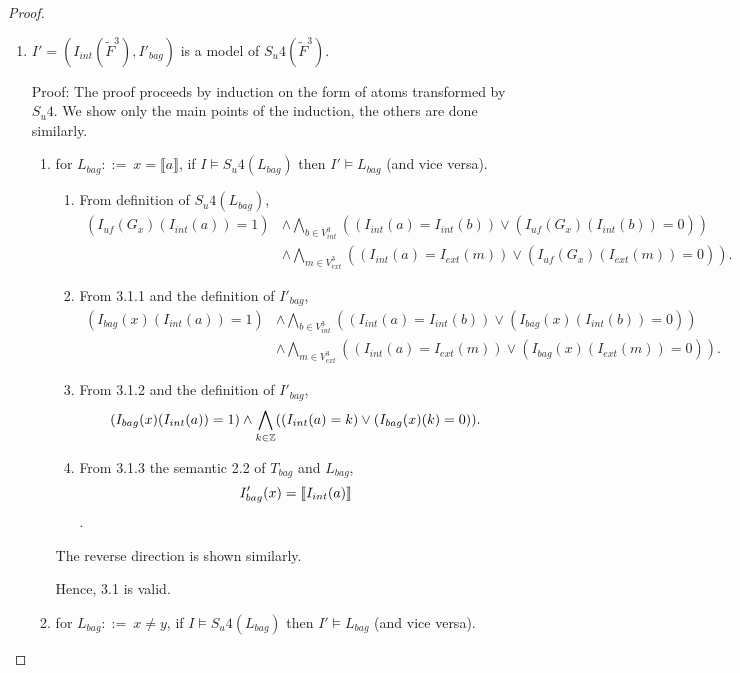 \begin{proof}
\begin{enumerate}[1.]
\item %
$I'=(I_{int}(\tilde{F}^3),I'_{bag})$ is a model of $S_{u}4(\tilde{F}^3)$.

Proof: The proof proceeds by induction on the form of atoms transformed by $S_{u}4$. We show only the main points of the induction, the others are done similarly.

\begin{enumerate}[3.1]
\item %
for $L_{bag} ::=\ x = \llbracket a \rrbracket$, if $I \models S_{u}4(L_{bag})$ then $I'\models L_{bag}$ (and vice versa). \\

\begin{enumerate}[3.1.1]
\item %
From definition of $S_{u}4(L_{bag})$,
\begin{align*}
(I_{\textit{uf}}(G_{x})(I_{int}(a)) = 1)  
&\land \underset{b\in V^3_{int}}{\bigwedge}((I_{int}(a) = I_{int}(b)) \lor (I_{\textit{uf}}(G_{x})(I_{int}(b)) = 0)) \\
&\land \underset{m\in V^3_{ext}}{\bigwedge}((I_{int}(a) = I_{ext}(m)) \lor (I_{\textit{uf}}(G_{x})(I_{ext}(m)) = 0)).
\end{align*}

\item %
From 3.1.1 and the definition of $I'_{bag}$,
\begin{align*}
(I_{bag}(x)(I_{int}(a)) = 1)  
&\land \underset{b\in V^3_{int}}{\bigwedge}((I_{int}(a) = I_{int}(b)) \lor (I_{bag}(x)(I_{int}(b)) = 0)) \\
&\land \underset{m\in V^3_{ext}}{\bigwedge}((I_{int}(a) = I_{ext}(m)) \lor (I_{bag}(x)(I_{ext}(m)) = 0)).
\end{align*}

\item %
From 3.1.2 and the definition of $I'_{bag}$,
$$(I_{bag}(x)(I_{int}(a)) = 1) \land \underset {k\in \mathbb{Z}}{\bigwedge}((I_{int}(a) = k) \lor (I_{bag}(x)(k) = 0)).$$

\item %
From 3.1.3 the semantic 2.2 of $T_{bag}$ and $L_{bag}$,
$$I'_{bag}(x) = \llbracket I_{int}(a) \rrbracket$$.

\end{enumerate}
The reverse direction is shown similarly.

Hence, 3.1 is valid.


\item %
for $L_{bag}::=\ x \neq y$, if $I \models S_{u}4(L_{bag})$ then $I'\models L_{bag}$ (and vice versa). \\


\end{enumerate}
\end{enumerate}
\end{proof}
